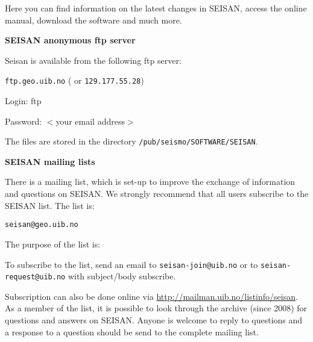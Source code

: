 Here you can find information on the latest changes in SEISAN, access the online manual, download the software and much more. 

\textbf{SEISAN anonymous ftp server}

Seisan is available from the following ftp server: 

\texttt{ftp.geo.uib.no} ( or \texttt{129.177.55.28}) 

Login: ftp

Password: $<$your email address$>$

The files are stored in the directory \texttt{/pub/seismo/SOFTWARE/SEISAN}. 

\textbf{SEISAN mailing lists} 

There is a mailing list, which is set-up to improve the exchange of information and questions on SEISAN. We strongly recommend that all users subscribe to the SEISAN list. The list is: 

\texttt{seisan@geo.uib.no}

The purpose of the list is: 

To subscribe to the list, send an email to \texttt{seisan-join@uib.no} or 
to \texttt{seisan-request@uib.no} with subject/body subscribe. 

Subscription can also be done online via 
\url{http://mailman.uib.no/listinfo/seisan}. 
As a member of the list, it is possible to look through the archive 
(since 2008) for questions and answers on SEISAN. Anyone is welcome 
to reply to questions and a response to a question should be send 
to the complete mailing list. 



